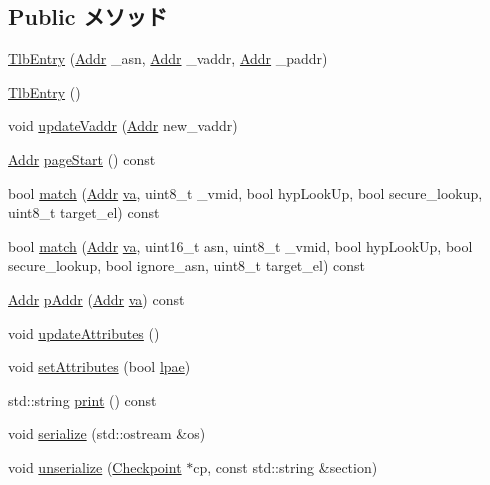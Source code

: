 \subsection*{Public メソッド}
\begin{DoxyCompactItemize}
\item 
\hyperlink{structArmISA_1_1TlbEntry_ad54289f363defd185361d4c812a4fca5}{TlbEntry} (\hyperlink{classm5_1_1params_1_1Addr}{Addr} \_\-asn, \hyperlink{classm5_1_1params_1_1Addr}{Addr} \_\-vaddr, \hyperlink{classm5_1_1params_1_1Addr}{Addr} \_\-paddr)
\item 
\hyperlink{structArmISA_1_1TlbEntry_ad069716fb78ffaa2d9bfba679a8eac9a}{TlbEntry} ()
\item 
void \hyperlink{structArmISA_1_1TlbEntry_a5b72666b92ee0adbe9a7d218a0343754}{updateVaddr} (\hyperlink{classm5_1_1params_1_1Addr}{Addr} new\_\-vaddr)
\item 
\hyperlink{classm5_1_1params_1_1Addr}{Addr} \hyperlink{structArmISA_1_1TlbEntry_ace6941a85652738b17b30edba098fb1f}{pageStart} () const 
\item 
bool \hyperlink{structArmISA_1_1TlbEntry_a5c66b3ae8abc8a1af010fd8331612e4b}{match} (\hyperlink{classm5_1_1params_1_1Addr}{Addr} \hyperlink{namespaceArmISA_a441099e13f407fadb6bcb0447107de87}{va}, uint8\_\-t \_\-vmid, bool hypLookUp, bool secure\_\-lookup, uint8\_\-t target\_\-el) const 
\item 
bool \hyperlink{structArmISA_1_1TlbEntry_afdf6523eda5c6858082970698c7b20b0}{match} (\hyperlink{classm5_1_1params_1_1Addr}{Addr} \hyperlink{namespaceArmISA_a441099e13f407fadb6bcb0447107de87}{va}, uint16\_\-t asn, uint8\_\-t \_\-vmid, bool hypLookUp, bool secure\_\-lookup, bool ignore\_\-asn, uint8\_\-t target\_\-el) const 
\item 
\hyperlink{classm5_1_1params_1_1Addr}{Addr} \hyperlink{structArmISA_1_1TlbEntry_ad851ad4bd44e8c1ce61ad96498197de8}{pAddr} (\hyperlink{classm5_1_1params_1_1Addr}{Addr} \hyperlink{namespaceArmISA_a441099e13f407fadb6bcb0447107de87}{va}) const 
\item 
void \hyperlink{structArmISA_1_1TlbEntry_af0effc7a0705e08862ba5c927caaad77}{updateAttributes} ()
\item 
void \hyperlink{structArmISA_1_1TlbEntry_ad4a13c759d4108dc9d0914a81b8d6703}{setAttributes} (bool \hyperlink{namespaceArmISA_ad3a840ce7ba10a7ca2515456d3c299a4}{lpae})
\item 
std::string \hyperlink{structArmISA_1_1TlbEntry_ae8a5b5e9e0e6be3b115ee77fa7b4d0c8}{print} () const 
\item 
void \hyperlink{structArmISA_1_1TlbEntry_a53e036786d17361be4c7320d39c99b84}{serialize} (std::ostream \&os)
\item 
void \hyperlink{structArmISA_1_1TlbEntry_af22e5d6d660b97db37003ac61ac4ee49}{unserialize} (\hyperlink{classCheckpoint}{Checkpoint} $\ast$cp, const std::string \&section)
\end{DoxyCompactItemize}
